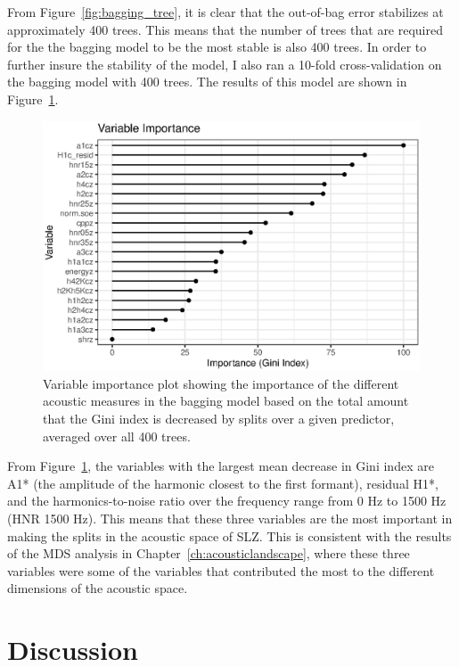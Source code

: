 From Figure~\ref{fig:bagging_tree}, it is clear that the out-of-bag error stabilizes at approximately 400 trees. This means that the number of trees that are required for the the bagging model to be the most stable is also 400 trees. In order to further insure the stability of the model, I also ran a 10-fold cross-validation on the bagging model with 400 trees. The results of this model are shown in Figure~\ref{fig:bagging_importance}.

\begin{figure}[!ht]
    \centering
    \includegraphics[width = 0.9\linewidth]{images/vip_bagging.eps}
    \caption{Variable importance plot showing the importance of the different acoustic measures in the bagging model based on the total amount that the Gini index is decreased by splits over a given predictor, averaged over all 400 trees.}
    \label{fig:bagging_importance}
\end{figure}

From Figure~\ref{fig:bagging_importance}, the variables with the largest mean decrease in Gini index are A1* (the amplitude of the harmonic closest to the first formant), residual H1*, and the harmonics-to-noise ratio over the frequency range from 0 Hz to 1500 Hz (HNR 1500 Hz). This means that these three variables are the most important in making the splits in the acoustic space of SLZ. This is consistent with the results of the MDS analysis in Chapter~\ref{ch:acousticlandscape}, where these three variables were some of the variables that contributed the most to the different dimensions of the acoustic space. 

\section{Discussion} \label{sec:bagging_discussion}

